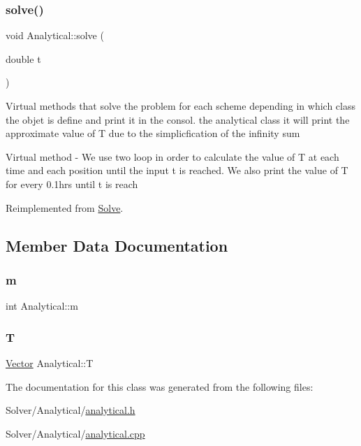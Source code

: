 \subsubsection{\texorpdfstring{solve()}{solve()}}
{\footnotesize\ttfamily void Analytical\+::solve (\begin{DoxyParamCaption}\item[{double}]{t }\end{DoxyParamCaption})\hspace{0.3cm}{\ttfamily [virtual]}}

Virtual methods that solve the problem for each scheme depending in which class the objet is define and print it in the consol.  the analytical class it will print the approximate value of T due to the simplicfication of the infinity sum

Virtual method -\/ We use two loop in order to calculate the value of T at each time and each position until the input t is reached. We also print the value of T for every 0.\+1hrs until t is reach 

Reimplemented from \hyperlink{class_solve_a1a56722993fdabea9928637d7dd8a2c7}{Solve}.



\subsection{Member Data Documentation}
\mbox{\label{class_analytical_a3a6b8bb5c9985bdfba024ecc378fef14}} 
\subsubsection{\texorpdfstring{m}{m}}
{\footnotesize\ttfamily int Analytical\+::m}

\mbox{\label{class_analytical_abee1da12ac56489506088600823328eb}} 
\subsubsection{\texorpdfstring{T}{T}}
{\footnotesize\ttfamily \hyperlink{class_vector}{Vector} Analytical\+::T}



The documentation for this class was generated from the following files\+:\begin{DoxyCompactItemize}
\item 
Solver/\+Analytical/\hyperlink{analytical_8h}{analytical.\+h}\item 
Solver/\+Analytical/\hyperlink{analytical_8cpp}{analytical.\+cpp}\end{DoxyCompactItemize}
